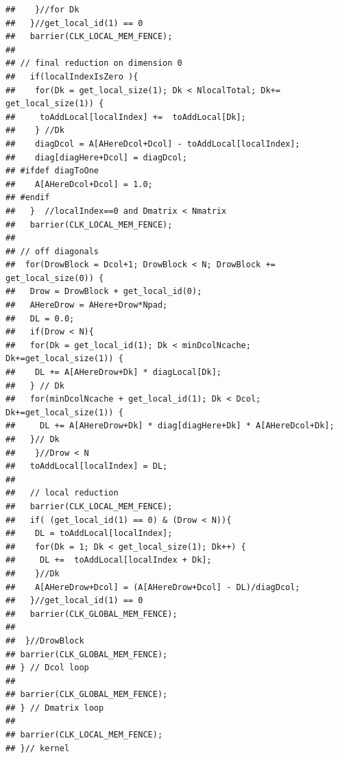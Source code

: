 \documentclass[article,nojss]{jss}\usepackage[]{graphicx}\usepackage[]{color}
\makeatletter
\newenvironment{kframe}{%
 \def\at@end@of@kframe{}%
 \ifinner\ifhmode%
  \def\at@end@of@kframe{\end{minipage}}%
  \begin{minipage}{\columnwidth}%
 \fi\fi%
 \def\FrameCommand##1{\hskip\@totalleftmargin \hskip-\fboxsep
 \colorbox{shadecolor}{##1}\hskip-\fboxsep
     \hskip-\linewidth \hskip-\@totalleftmargin \hskip\columnwidth}%
 \MakeFramed {\advance\hsize-\width
   \@totalleftmargin\z@ \linewidth\hsize
   \@setminipage}}%
 {\par\unskip\endMakeFramed%
 \at@end@of@kframe}
\newenvironment{knitrout}{}{} %
\makeatother
\begin{document}
\begin{knitrout}
\begin{kframe}
\begin{verbatim}
##    }//for Dk
##   }//get_local_id(1) == 0
##   barrier(CLK_LOCAL_MEM_FENCE);
## 
## // final reduction on dimension 0
##   if(localIndexIsZero ){
##    for(Dk = get_local_size(1); Dk < NlocalTotal; Dk+= get_local_size(1)) {
##     toAddLocal[localIndex] +=  toAddLocal[Dk];
##    } //Dk
##    diagDcol = A[AHereDcol+Dcol] - toAddLocal[localIndex];
##    diag[diagHere+Dcol] = diagDcol;
## #ifdef diagToOne
##    A[AHereDcol+Dcol] = 1.0;
## #endif
##   }  //localIndex==0 and Dmatrix < Nmatrix
##   barrier(CLK_LOCAL_MEM_FENCE);
## 
## // off diagonals
##  for(DrowBlock = Dcol+1; DrowBlock < N; DrowBlock += get_local_size(0)) {
##   Drow = DrowBlock + get_local_id(0);
##   AHereDrow = AHere+Drow*Npad;
##   DL = 0.0;
##   if(Drow < N){
##   for(Dk = get_local_id(1); Dk < minDcolNcache; Dk+=get_local_size(1)) {
##    DL += A[AHereDrow+Dk] * diagLocal[Dk];
##   } // Dk
## 	 for(minDcolNcache + get_local_id(1); Dk < Dcol; Dk+=get_local_size(1)) {
##     DL += A[AHereDrow+Dk] * diag[diagHere+Dk] * A[AHereDcol+Dk];
##   }// Dk
##    }//Drow < N
##   toAddLocal[localIndex] = DL;
## 
##   // local reduction
##   barrier(CLK_LOCAL_MEM_FENCE);
##   if( (get_local_id(1) == 0) & (Drow < N)){
##    DL = toAddLocal[localIndex];
##    for(Dk = 1; Dk < get_local_size(1); Dk++) {
##     DL +=  toAddLocal[localIndex + Dk];
##    }//Dk
##    A[AHereDrow+Dcol] = (A[AHereDrow+Dcol] - DL)/diagDcol;
##   }//get_local_id(1) == 0
##   barrier(CLK_GLOBAL_MEM_FENCE);
## 
##  }//DrowBlock
## barrier(CLK_GLOBAL_MEM_FENCE);
## } // Dcol loop
## 
## barrier(CLK_GLOBAL_MEM_FENCE);
## } // Dmatrix loop
## 
## barrier(CLK_LOCAL_MEM_FENCE);
## }// kernel
\end{verbatim}
\end{kframe}
\end{knitrout}
\end{document}
